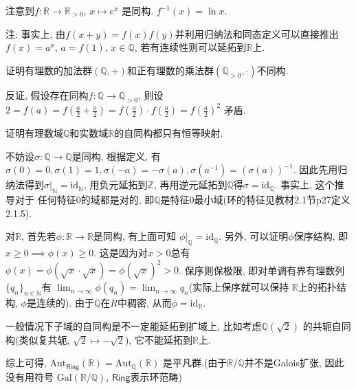 \begin{solution}
    注意到$f: \mathbb{R} \to \mathbb{R}_{>0},\, x \mapsto e^x$
是同构. $f^{-1}(x) = \ln x$.

注: 事实上, 由$f(x + y) = f(x)f(y)$并利用归纳法和同态定义可以直接推出
$f(x) = a^x,\, a = f(1),\, x \in \mathbb{Q}$, 若有连续性则可以延拓到$\mathbb{R}$上.
\end{solution}

\begin{problem}
    证明有理数的加法群$(\mathbb{Q}, +)$和正有理数的乘法群$(\mathbb{Q}_{>0}, \cdot)$不同构.
\end{problem}

\begin{solution}
    反证, 假设存在同构$f: \mathbb{Q} \to \mathbb{Q}_{>0}$,
则设$2 = f(a) = f(\frac{a}{2} + \frac{a}{2}) = f(\frac{a}{2}) \cdot f(\frac{a}{2}) = f(\frac{a}{2})^2$
矛盾.
\end{solution}

\begin{problem}\label{ex:1.4.7}
    证明有理数域$\mathbb{Q}$和实数域$\mathbb{R}$的自同构都只有恒等映射.
\end{problem}

\begin{solution}
    不妨设$\sigma: \mathbb{Q} \to \mathbb{Q}$是同构, 根据定义,
有$\sigma(0) = 0, \sigma(1) = 1, \sigma(-a) = -\sigma(a), \sigma(a^{-1}) = (\sigma(a))^{-1}$.
因此先用归纳法得到$\sigma|_{\mathbb{N}} = \mathrm{id}_{\mathbb{N}}$, 用负元延拓到$\mathbb{Z}$,
再用逆元延拓到$\mathbb{Q}$得$\sigma = \mathrm{id}_{\mathbb{Q}}$. 事实上, 这个推导对于
任何特征$0$的域都是对的, 即$\mathbb{Q}$是特征$0$最小域(环的特征见教材2.1节p27定义2.1.5).

    对$\mathbb{R}$, 首先若$\phi: \mathbb{R} \to \mathbb{R}$是同构, 有上面可知
$\phi|_{\mathbb{Q}} = \mathrm{id}_{\mathbb{Q}}$. 另外, 可以证明$\phi$保序结构,
即$x \geqslant 0 \implies \phi(x) \geqslant 0$. 这是因为对$x > 0$总有
$\phi(x) = \phi(\sqrt{x} \cdot \sqrt{x}) = \phi(\sqrt{x})^2 > 0$. 保序则保极限,
即对单调有界有理数列$\{q_n\}_{n \in \mathbb{N}}$有
$\lim_{n \to \infty} \phi(q_n) = \lim_{n \to \infty} q_n$(实际上保序就可以保持
$\mathbb{R}$上的拓扑结构, $\phi$是连续的). 由于$\mathbb{Q}$在$R$中稠密,
从而$\phi = \mathrm{id}_{\mathbb{R}}$.

    一般情况下子域的自同构是不一定能延拓到扩域上, 比如考虑$\mathbb{Q}(\sqrt{2})$
的共轭自同构(类似复共轭, $\sqrt{2} \mapsto -\sqrt{2}$), 它不能延拓到$\mathbb{R}$上.

    综上可得,
$\mathrm{Aut}_{\mathsf{Ring}}(\mathbb{R}) = \mathrm{Aut}_{\mathbb{Q}}(\mathbb{R})$
是平凡群.(由于$\mathbb{R}/\mathbb{Q}$并不是Galois扩张, 因此没有用符号
$\mathrm{Gal}(\mathbb{R}/\mathbb{Q})$, $\mathsf{Ring}$表示环范畴)
\end{solution}

